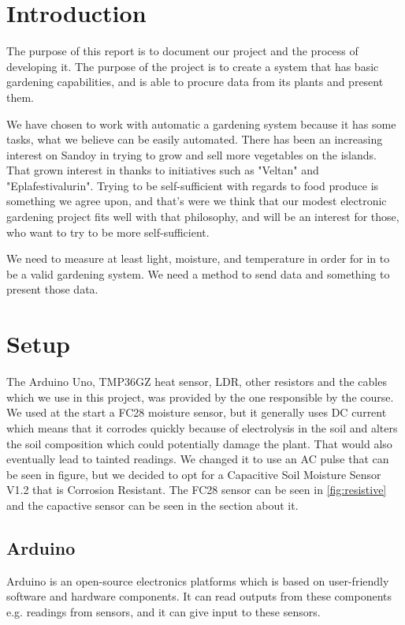 \documentclass[a4paper,12pt,oneside,openright,titlepage]{book}
\begin{document}
\mainmatter
\chapter{Introduction}

The purpose of this report is to document our project and the process of developing it. The purpose of the project is to create a system that has basic gardening capabilities, and is able to procure data from its plants and present them.

We have chosen to work with automatic a gardening system because it has some tasks, what we believe can be easily automated. There has been an increasing interest on Sandoy in trying to grow and sell more vegetables on the islands. That grown interest in thanks to initiatives such as "Veltan" and "Eplafestivalurin". Trying to be self-sufficient with regards to food produce is something we agree upon, and that's were we think that our modest electronic gardening project fits well with that philosophy, and will be an interest for those, who want to try to be more self-sufficient.

We need to measure at least light, moisture, and temperature in order for in to be a valid gardening system. We need a method to send data and something to present those data.

\chapter{Setup}
The Arduino Uno, TMP36GZ heat sensor, LDR, other resistors and the cables which we use in this project, was provided by the one responsible by the course. We used at the start a FC28 moisture sensor, but it generally uses DC current which means that it corrodes quickly because of electrolysis in the soil and alters the soil composition which could potentially damage the plant. That would also eventually lead to tainted readings. We changed it to use an AC pulse that can be seen in figure, but we decided to opt for a Capacitive Soil Moisture Sensor V1.2 that is Corrosion Resistant. The FC28 sensor can be seen in \ref{fig:resistive} and the capactive sensor can be seen in the section about it.

\section{Arduino}
Arduino is an open-source electronics platforms which is based on user-friendly software and hardware components\cite{ArduinoIntroduction}. It can read outputs from these components e.g. readings from sensors, and it can give input to these sensors.
\end{document}
